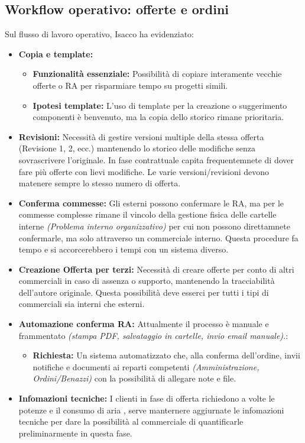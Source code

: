 \documentclass[12pt, a4paper]{article} %
\begin{document}
\subsection{Workflow operativo: offerte e ordini}
Sul flusso di lavoro operativo, Isacco ha evidenziato:
\begin{itemize}
      \item \textbf{Copia e template:}
            \begin{itemize}
                  \item \textbf{Funzionalità essenziale:} Possibilità di copiare interamente vecchie offerte o
                        RA per risparmiare tempo su progetti simili.
                  \item \textbf{Ipotesi template:} L'uso di template per la creazione o suggerimento componenti è benvenuto, ma la copia dello storico rimane prioritaria.
            \end{itemize}
      \item \textbf{Revisioni:} Necessità di gestire versioni multiple della stessa offerta (Revisione 1, 2, ecc.) mantenendo lo storico delle modifiche senza sovrascrivere l'originale.
            In fase contrattuale capita frequentemnete di dover fare più offerte con lievi modifiche. Le varie versioni/revisioni devono matenere sempre lo stesso numero di offerta.
      \item \textbf{Conferma commesse:} Gli esterni possono confermare le RA, ma per le commesse complesse rimane il vincolo della gestione fisica delle cartelle interne \textit{(Problema interno organizzativo)} per cui non possono direttamnete confermarle,
            ma solo attraverso un commerciale interno. Questa procedure fa tempo e si accorcerebbero i tempi con un sistema diverso.
      \item \textbf{Creazione Offerta per terzi:} Necessità di creare offerte per conto di altri commerciali in caso di assenza o supporto, mantenendo la tracciabilità dell'autore originale.
            Questa possibilità deve esserci per tutti i tipi di commerciali sia interni che esterni.
      \item \textbf{Automazione conferma RA:}
            Attualmente il processo è manuale e frammentato \textit{(stampa PDF,
                  salvataggio in cartelle, invio email manuale).}:
            \begin{itemize}
                  \item \textbf{Richiesta:} Un sistema automatizzato che, alla conferma dell'ordine, invii notifiche e documenti ai reparti competenti
                        \textit{(Amministrazione, Ordini/Benazzi)} con la possibilità di allegare note e file.
            \end{itemize}
      \item \textbf{Infomazioni tecniche:} I clienti in fase di offerta richiedono a volte le potenze e il consumo di aria ,
            serve manternere aggiurnate le infomazioni tecniche per dare la possibilità al commerciale di quantificarle  preliminarmente in questa fase.
\end{itemize}
\end{document}
